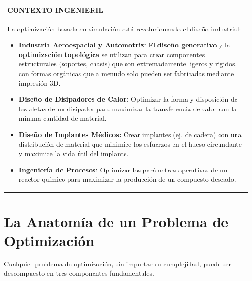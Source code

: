 \begin{center}
\begin{tabular}{|p{}|}
\hline
\textbf{CONTEXTO INGENIERIL} \\
La optimización basada en simulación está revolucionando el diseño industrial:
\begin{itemize}
    \item \textbf{Industria Aeroespacial y Automotriz:} El \textbf{diseño generativo} y la \textbf{optimización topológica} se utilizan para crear componentes estructurales (soportes, chasis) que son extremadamente ligeros y rígidos, con formas orgánicas que a menudo solo pueden ser fabricadas mediante impresión 3D.
    \item \textbf{Diseño de Disipadores de Calor:} Optimizar la forma y disposición de las aletas de un disipador para maximizar la transferencia de calor con la mínima cantidad de material.
    \item \textbf{Diseño de Implantes Médicos:} Crear implantes (ej. de cadera) con una distribución de material que minimice los esfuerzos en el hueso circundante y maximice la vida útil del implante.
    \item \textbf{Ingeniería de Procesos:} Optimizar los parámetros operativos de un reactor químico para maximizar la producción de un compuesto deseado.
\end{itemize}
\\
\hline
\end{tabular}
\end{center}

\section{La Anatomía de un Problema de Optimización}
\label{sec:opt-theory}
Cualquier problema de optimización, sin importar su complejidad, puede ser descompuesto en tres componentes fundamentales.


